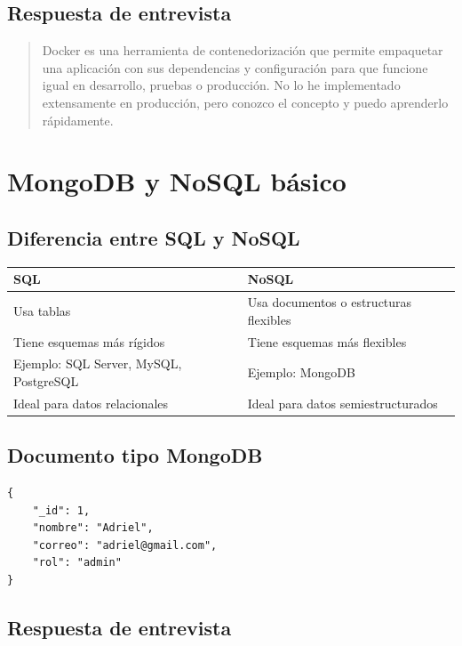 \documentclass[12pt]{article}
\begin{document}
\subsection{Respuesta de entrevista}

\begin{quote}
Docker es una herramienta de contenedorización que permite empaquetar una aplicación con sus dependencias y configuración para que funcione igual en desarrollo, pruebas o producción. No lo he implementado extensamente en producción, pero conozco el concepto y puedo aprenderlo rápidamente.
\end{quote}

\section{MongoDB y NoSQL básico}

\subsection{Diferencia entre SQL y NoSQL}

\begin{longtable}{|p{6cm}|p{6cm}|}
\hline
\textbf{SQL} & \textbf{NoSQL} \\
\hline
Usa tablas & Usa documentos o estructuras flexibles \\
\hline
Tiene esquemas más rígidos & Tiene esquemas más flexibles \\
\hline
Ejemplo: SQL Server, MySQL, PostgreSQL & Ejemplo: MongoDB \\
\hline
Ideal para datos relacionales & Ideal para datos semiestructurados \\
\hline
\end{longtable}

\subsection{Documento tipo MongoDB}

\begin{lstlisting}
{
    "_id": 1,
    "nombre": "Adriel",
    "correo": "adriel@gmail.com",
    "rol": "admin"
}
\end{lstlisting}

\subsection{Respuesta de entrevista}
\end{document}
